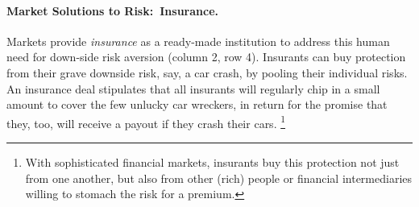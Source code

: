 

\paragraph{Market Solutions to Risk:\ Insurance.}
	\label{sec:insurance}
Markets provide \emph{insurance} as a ready-made institution to address this human need for down-side risk aversion (column 2, row 4).
Insurants can buy protection from their grave downside risk, say, a car crash, by pooling their individual risks.
An insurance deal stipulates that all insurants will regularly chip in a small amount to cover the few unlucky car wreckers, in return for the promise that they, too, will receive a payout if they crash their cars.
\footnote{
	With sophisticated financial markets, insurants buy this protection not just from one another, but also from other (rich) people or financial intermediaries willing to stomach the risk for a premium.
}

